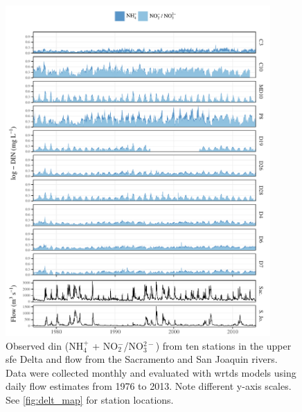 \documentclass[letterpaper,12pt,oneside]{article}\usepackage[]{graphicx}\usepackage[]{color}
\begin{document}
\begin{figure}[!ht]

{\centering \includegraphics[width=0.9\textwidth]{figs/obsdat-1} 

}

\caption{Observed \ac{din} (NH$_4^{+}$ + NO$_2^{-}$/NO$_3^{2-}$) from ten stations in the upper \ac{sfe} Delta and flow from the Sacramento and San Joaquin rivers.  Data were collected monthly and evaluated with \ac{wrtds} models using daily flow estimates from 1976 to 2013. Note different y-axis scales.  See \cref{fig:delt_map} for station locations.}\label{fig:obsdat}
\end{figure}
\end{document}
